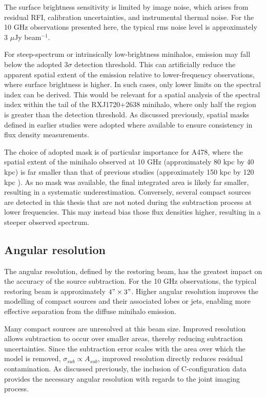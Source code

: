 The surface brightness sensitivity is limited by image noise, which arises from residual RFI, calibration uncertainties, and instrumental thermal noise. For the 10 GHz observations presented here, the typical rms noise level is approximately $3$ $\mu$Jy beam$^{-1}$. 

For steep-spectrum or intrinsically low-brightness minihalos, emission may fall below the adopted $3\sigma$ detection threshold. This can artificially reduce the apparent spatial extent of the emission relative to lower-frequency observations, where surface brightness is higher. In such cases, only lower limits on the spectral index can be derived. This would be relevant for a spatial analysis of the spectral index within the tail of the RXJ1720+2638 minihalo, where only half the region is greater than the detection threshold. As discussed previously, spatial masks defined in earlier studies were adopted where available to ensure consistency in flux density measurements. 

The choice of adopted mask is of particular importance for A478, where the spatial extent of the minihalo observed at 10 GHz (approximately 80 kpc by 40 kpc) is far smaller than that of previous studies (approximately 150 kpc by 120 kpc \citep{Giacintucci2014}). As no mask was available, the final integrated area is likely far smaller, resulting in a systematic underestimation. Conversely, several compact sources are detected in this thesis that are not noted during the subtraction process at lower frequencies. This may instead bias those flux densities higher, resulting in a steeper observed spectrum.

\subsection{Angular resolution}
The angular resolution, defined by the restoring beam, has the greatest impact on the accuracy of the source subtraction. For the 10 GHz observations, the typical restoring beam is approximately $4"\times3"$. Higher angular resolution improves the modelling of compact sources and their associated lobes or jets, enabling more effective separation from the diffuse minihalo emission.

Many compact sources are unresolved at this beam size. Improved resolution allows subtraction to occur over smaller areas, thereby reducing subtraction uncertainties. Since the subtraction error scales with the area over which the model is removed, $\sigma_{sub} \propto A_{sub}$, improved resolution directly reduces residual contamination. As discussed previously, the inclusion of C-configuration data provides the necessary angular resolution with regards to the joint imaging process.

